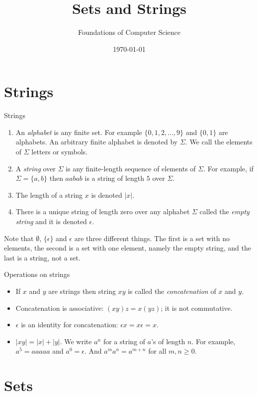 \documentclass[style=sailor,size=12pt]{powerdot}
\title{Sets and Strings}
\author{Foundations of Computer Science}
\date{\today}
\begin{document}
\maketitle
\section[slide=false]{Strings}
\begin{slide}[bm=,toc=]{Strings}
\begin{enumerate}
\item An \emph{alphabet} is any finite set. For example $\{0,1,2,...,9\}$ and
      $\{0,1\}$ are alphabets. An arbitrary finite alphabet is denoted by 
      $\Sigma$. We call the elements of $\Sigma$ letters or symbols.
\item A \emph{string} over $\Sigma$ is any finite-length sequence of elements of
      $\Sigma$. For example, if $\Sigma = \{a,b\}$ then $aabab$ is a string of
      length $5$ over $\Sigma$.
\item The length of a string $x$ is denoted $|x|$. 
\item There is a unique string of length zero over any alphabet $\Sigma$ called
      the \emph{empty string} and it is denoted $\epsilon$.
\end{enumerate} 
    Note that $\emptyset$, $\{\epsilon\}$ and $\epsilon$ are three different things.
    The first is a set with no elements, the second is a set with one element,
    namely the empty string, and the last is a string, not a set.
\end{slide}

\begin{slide}[bm=,toc=]{Operations on strings}

\begin{itemize}
\item If $x$ and $y$ are strings then string $xy$ is called the
\emph{concatenation} of $x$ and $y$.
\item Concatenation is associative: $(xy)z = x(yz)$; it is not commutative.
\item $\epsilon$ is an identity for concatenation: ${\epsilon}x = x\epsilon = x$. 
\item $|xy| = |x| + |y|$. We write $a^n$ for a string of $a$'s of length $n$.
For example, $a^5 = aaaaa$ and $a^0 = \epsilon$. And $a^ma^n = a^{m+n}$ for all
$m,n \geq 0.$
\end{itemize} 

\end{slide}
\section[slide=false]{Sets}
\end{document}
